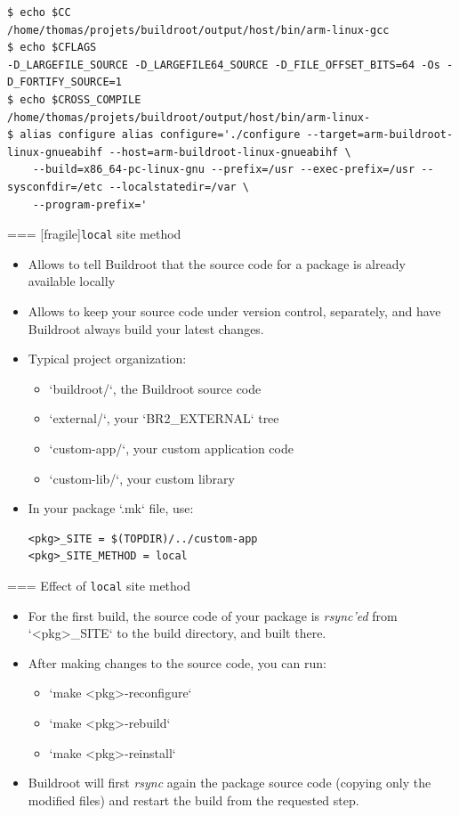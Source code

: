   \begin{block}{}
  {\tiny
\begin{verbatim}
$ echo $CC
/home/thomas/projets/buildroot/output/host/bin/arm-linux-gcc
$ echo $CFLAGS
-D_LARGEFILE_SOURCE -D_LARGEFILE64_SOURCE -D_FILE_OFFSET_BITS=64 -Os -D_FORTIFY_SOURCE=1
$ echo $CROSS_COMPILE 
/home/thomas/projets/buildroot/output/host/bin/arm-linux-
$ alias configure alias configure='./configure --target=arm-buildroot-linux-gnueabihf --host=arm-buildroot-linux-gnueabihf \
    --build=x86_64-pc-linux-gnu --prefix=/usr --exec-prefix=/usr --sysconfdir=/etc --localstatedir=/var \
    --program-prefix='
\end{verbatim}
  }
\end{block}



=== [fragile]{{\tt local} site method}
  \begin{itemize}
  \item Allows to tell Buildroot that the source code for a package is
    already available locally
  \item Allows to keep your source code under version control,
    separately, and have Buildroot always build your latest changes.
  \item Typical project organization:
    \begin{itemize}
    \item `buildroot/`, the Buildroot source code
    \item `external/`, your `BR2_EXTERNAL` tree
    \item `custom-app/`, your custom application code
    \item `custom-lib/`, your custom library
    \end{itemize}
  \item In your package `.mk` file, use:
    \begin{block}{}
\begin{verbatim}
<pkg>_SITE = $(TOPDIR)/../custom-app
<pkg>_SITE_METHOD = local
\end{verbatim}
    \end{block}
  \end{itemize}


=== {Effect of {\tt local} site method}
  \begin{itemize}
  \item For the first build, the source code of your package is {\em
      rsync'ed} from `<pkg>_SITE` to the build directory, and
    built there.
  \item After making changes to the source code, you can run:
    \begin{itemize}
    \item `make <pkg>-reconfigure`
    \item `make <pkg>-rebuild`
    \item `make <pkg>-reinstall`
    \end{itemize}
  \item Buildroot will first {\em rsync} again the package source code
    (copying only the modified files) and restart the build from the
    requested step.
  \end{itemize}


